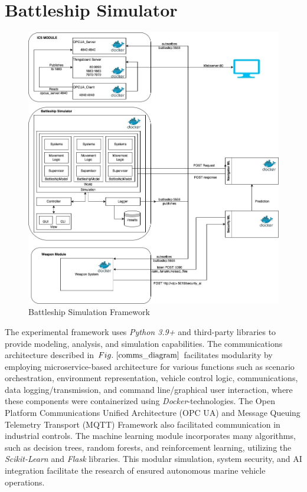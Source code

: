 \documentclass[conference]{IEEEtran}
\begin{document}
\section{Battleship Simulator}
\begin{figure}
    \centering
    \includegraphics[width=0.84\linewidth]{communication_diagram_v2.png}
    \caption{Battleship Simulation Framework}
    \label{comms_diagram}
\end{figure} 
The experimental framework uses \textit{Python 3.9+} and third-party libraries to provide modeling, analysis, and simulation capabilities. The communications architecture described in \(Fig.~\ref{comms_diagram}\) facilitates modularity by employing microservice-based architecture for various functions such as scenario orchestration, environment representation, vehicle control logic, communications, data logging/transmission, and command line/graphical user interaction, where these components were containerized using \textit{Docker}-technologies. The Open Platform Communications Unified Architecture (OPC UA) and Message Queuing Telemetry Transport (MQTT) Framework also facilitated communication in industrial controls. The machine learning module incorporates many algorithms, such as decision trees, random forests, and reinforcement learning, utilizing the \textit{Scikit-Learn} and \textit{Flask} libraries. This modular simulation, system security, and AI integration facilitate the research of ensured autonomous marine vehicle operations.
\end{document}
